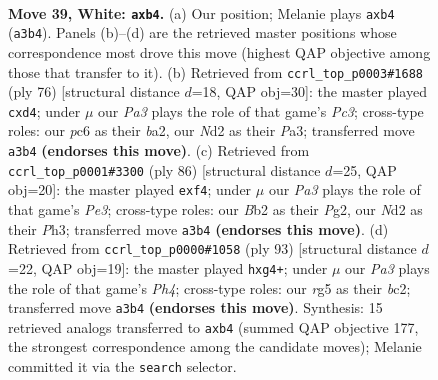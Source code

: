\documentclass[11pt]{article}
\begin{document}
\clearpage

\begin{figure}[p]\centering
\begin{subfigure}{0.46\textwidth}\centering
\resizebox{\linewidth}{!}{%
\newchessgame
\chessboard[
  setfen={5k2/8/2p5/6rp/1r6/P6K/1B1N4/8 w - - 0 39},
  showmover=false,
  pgfstyle=straightmove, color=movearrow, markmove={a3-b4}
]}
\caption{}
\end{subfigure}\hfill
\begin{subfigure}{0.46\textwidth}\centering
\resizebox{\linewidth}{!}{%
\newchessgame
\chessboard[
  setfen={8/5k2/p7/8/p2r1B2/P1P5/b7/2K5 w - - 0 39},
  showmover=false,
  pgfstyle=straightmove, color=movearrow, markmove={c3-d4}
]}
\caption{}
\end{subfigure}
\\[4pt]
\begin{subfigure}{0.46\textwidth}\centering
\resizebox{\linewidth}{!}{%
\newchessgame
\chessboard[
  setfen={8/R7/5kp1/8/5r2/4P2P/1r4P1/4K3 w - - 0 44},
  showmover=false,
  pgfstyle=straightmove, color=movearrow, markmove={e3-f4}
]}
\caption{}
\end{subfigure}\hfill
\begin{subfigure}{0.46\textwidth}\centering
\resizebox{\linewidth}{!}{%
\newchessgame
\chessboard[
  setfen={8/6k1/8/3n2Pp/6R1/5K2/2B5/8 b - - 0 47},
  showmover=false,
  pgfstyle=straightmove, color=movearrow, markmove={h5-g4}
]}
\caption{}
\end{subfigure}
\caption{\textbf{Move 39, White: \texttt{axb4}.} (a) Our position; Melanie plays \texttt{axb4} (\texttt{a3b4}). Panels (b)--(d) are the retrieved master positions whose correspondence most drove this move (highest QAP objective among those that transfer to it). (b) Retrieved from \texttt{ccrl\_top\_p0003\#1688} (ply 76) [structural distance $d$=18, QAP obj=30]: the master played \texttt{cxd4}; under $\mu$ our \emph{Pa3} plays the role of that game's \emph{Pc3}; cross-type roles: our \emph{p}c6 as their \emph{b}a2, our \emph{N}d2 as their \emph{P}a3; transferred move \texttt{a3b4} \textbf{(endorses this move)}. (c) Retrieved from \texttt{ccrl\_top\_p0001\#3300} (ply 86) [structural distance $d$=25, QAP obj=20]: the master played \texttt{exf4}; under $\mu$ our \emph{Pa3} plays the role of that game's \emph{Pe3}; cross-type roles: our \emph{B}b2 as their \emph{P}g2, our \emph{N}d2 as their \emph{P}h3; transferred move \texttt{a3b4} \textbf{(endorses this move)}. (d) Retrieved from \texttt{ccrl\_top\_p0000\#1058} (ply 93) [structural distance $d$=22, QAP obj=19]: the master played \texttt{hxg4+}; under $\mu$ our \emph{Pa3} plays the role of that game's \emph{Ph4}; cross-type roles: our \emph{r}g5 as their \emph{b}c2; transferred move \texttt{a3b4} \textbf{(endorses this move)}. Synthesis: 15 retrieved analogs transferred to \texttt{axb4} (summed QAP objective 177, the strongest correspondence among the candidate moves); Melanie committed it via the \texttt{search} selector.}
\label{fig:thought-m76}
\end{figure}
\end{document}

